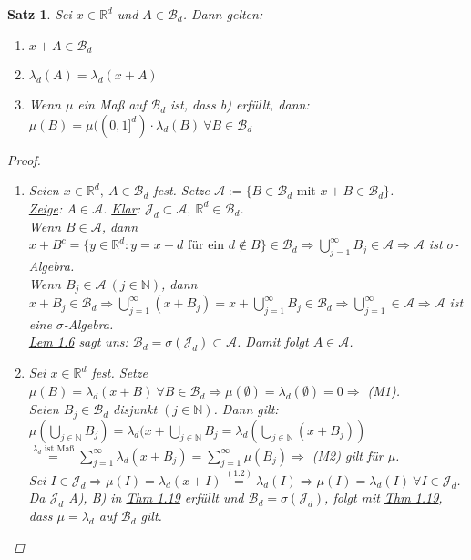 \documentclass[a4paper]{report}
\newcommand{\R}{\mathbb{R}}
\newcommand{\N}{\mathbb{N}}
\newcommand{\Borel}{\mathcal{B}}
\newcommand{\Bd}{\Borel_d}
\newcommand{\Jd}{\mathcal{J}_d}
\newcommand{\jlabel}[1]{\label{j_#1}}
\newcommand{\jhyperref}[2]{\hyperref[j_#1]{#2}}
\newcommand{\jlink}[1]{\jhyperref{#1}{#1}}
\theoremstyle{plain}
\newtheorem{satz}[thm]{Satz}
\theoremstyle{definition}
\begin{document}
{{{\begin{satz}
\jlabel{Satz 1.24}
    Sei $x \in \R^d$ und $A\in \Bd$. Dann gelten:
    \begin{enumerate}
        \item $x + A \in \Bd$
        \item $\lambda_d(A) = \lambda_d(x + A)$
        \item 
            Wenn $\mu$ ein Maß auf $\Bd$ ist, dass b) erfüllt, dann:\\
            $\mu(B) = \mu((0,1]^d)\cdot \lambda_d(B) \ \forall B \in \Bd$
    \end{enumerate}
    \begin{proof}
        \begin{enumerate}
            \item
                Seien $x \in \R^d, \ A\in \Bd$ fest. Setze $\mathcal{A} := \{B\in \Bd \text{ mit } x + B \in \Bd\}$.\\
                \uline{Zeige}: $A\in\mathcal{A}$. \uline{Klar}: $\Jd \subset \mathcal{A},\ \R^d \in \Bd$.\\
                Wenn $B\in\mathcal{A}$, dann $x+B^c = \{y\in \R^d : y = x+d \text{ für ein } d \notin B\} \in \Bd \Rightarrow \bigcup_{j=1}^\infty B_j \in \mathcal{A} \Rightarrow \mathcal{A}$ ist $\sigma$-Algebra.\\
                Wenn $B_j \in \mathcal{A} \ (j\in\N)$, dann $x+B_j \in \Bd \Rightarrow \bigcup_{j=1}^\infty (x+B_j) = x + \bigcup_{j=1}^\infty B_j \in \Bd \Rightarrow \bigcup_{j=1}^\infty \in \mathcal{A} \Rightarrow \mathcal{A}$ ist eine $\sigma$-Algebra.\\
                \jlink{Lem 1.6} sagt uns: $\Bd = \sigma(\Jd)\subset \mathcal{A}$. Damit folgt $A\in \mathcal{A}$.
                
            \item
                Sei $x \in \R^d$ fest. Setze $\mu(B) = \lambda_d(x+B) \ \forall B\in \Bd \Rightarrow \mu(\emptyset) = \lambda_d(\emptyset) = 0 \Rightarrow$ (M1).\\
                Seien $B_j \in \Bd$ disjunkt $(j\in\N)$. Dann gilt:\\
                $\mu(\bigcup_{j\in\N} B_j) = \lambda_d(x + \bigcup_{j\in\N} B_j = \lambda_d(\bigcup_{j\in\N} (x + B_j)) $\\
                $\overset{\text{$\lambda_d$ ist Maß}}{=} \sum_{j=1}^\infty \lambda_d(x + B_j) = \sum_{j=1}^\infty \mu(B_j) \Rightarrow$ (M2) gilt für $\mu$.\\
                Sei $I\in \Jd \Rightarrow \mu(I) = \lambda_d(x+I) \overset{\jlink{(1.2)}}{=} \lambda_d(I) \Rightarrow \mu(I) = \lambda_d(I) \ \forall I \in \Jd$. Da $\Jd$ A), B) in \jlink{Thm 1.19} erfüllt und $\Bd = \sigma(\Jd)$, folgt mit \jlink{Thm 1.19}, dass $\mu = \lambda_d$ auf $\Bd$ gilt.
                

\end{enumerate}
\end{proof}
\end{satz}}}}
\end{document}
